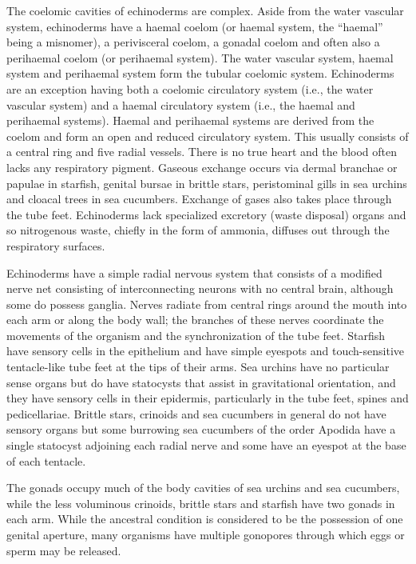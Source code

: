 The coelomic cavities of echinoderms are complex. Aside from the water
vascular system, echinoderms have a haemal coelom (or haemal system, the
``haemal'' being a misnomer), a perivisceral coelom, a gonadal coelom
and often also a perihaemal coelom (or perihaemal system). The water
vascular system, haemal system and perihaemal system form the tubular
coelomic system. Echinoderms are an exception having both a coelomic
circulatory system (i.e., the water vascular system) and a haemal
circulatory system (i.e., the haemal and perihaemal systems). Haemal and
perihaemal systems are derived from the coelom and form an open and
reduced circulatory system. This usually consists of a central ring and
five radial vessels. There is no true heart and the blood often lacks
any respiratory pigment. Gaseous exchange occurs via dermal branchae or
papulae in starfish, genital bursae in brittle stars, peristominal gills
in sea urchins and cloacal trees in sea cucumbers. Exchange of gases
also takes place through the tube feet. Echinoderms lack specialized
excretory (waste disposal) organs and so nitrogenous waste, chiefly in
the form of ammonia, diffuses out through the respiratory surfaces.

Echinoderms have a simple radial nervous system that consists of a
modified nerve net consisting of interconnecting neurons with no central
brain, although some do possess ganglia. Nerves radiate from central
rings around the mouth into each arm or along the body wall; the
branches of these nerves coordinate the movements of the organism and
the synchronization of the tube feet. Starfish have sensory cells in the
epithelium and have simple eyespots and touch-sensitive tentacle-like
tube feet at the tips of their arms. Sea urchins have no particular
sense organs but do have statocysts that assist in gravitational
orientation, and they have sensory cells in their epidermis,
particularly in the tube feet, spines and pedicellariae. Brittle stars,
crinoids and sea cucumbers in general do not have sensory organs but
some burrowing sea cucumbers of the order Apodida have a single
statocyst adjoining each radial nerve and some have an eyespot at the
base of each tentacle.

The gonads occupy much of the body cavities of sea urchins and sea
cucumbers, while the less voluminous crinoids, brittle stars and
starfish have two gonads in each arm. While the ancestral condition is
considered to be the possession of one genital aperture, many organisms
have multiple gonopores through which eggs or sperm may be released.

